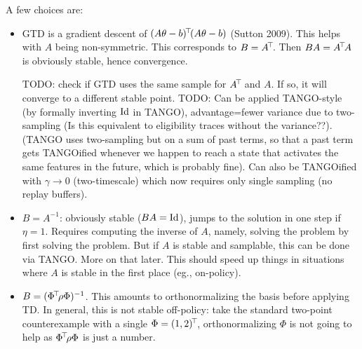 \documentclass[11pt,a4paper]{article}
\begin{document}
A few choices are:
\begin{itemize}
\item GTD is a gradient descent of
$(A\theta-b)^{\!\top}\!(A\theta-b)$ (Sutton 2009). This helps with $A$ being non-symmetric.
This corresponds to $B=A^{\!\top}\!$. Then
$BA=A^{\!\top}\!A$ is
obviously stable, hence convergence.

TODO: check if
GTD uses the same sample for $A^{\!\top}\!$ and $A$. If so, it will
converge to a different stable point. TODO: Can be applied TANGO-style
(by formally inverting $\operatorname{Id}$ in TANGO), advantage=fewer variance due to
two-sampling (Is this equivalent to eligibility traces without the
variance??). (TANGO uses two-sampling but on a sum of past terms, so
that a past term gets TANGOified whenever we happen to reach a state that
activates the same features in the future, which is probably fine). Can
also be TANGOified with $\gamma\to 0$ (two-timescale) which now requires
only single sampling (no replay buffers).

\item $B=A^{-1}$: obviously stable ($BA=\operatorname{Id}$), jumps to the solution in one step if
$\eta=1$. Requires computing the inverse of $A$, namely, solving the
problem by first solving the problem. But if $A$ is stable and samplable,
this can be done via TANGO. More on that later. This should speed up
things in situations where $A$ is stable in the first place (eg.,
on-policy).

\item $B=(\Phi^{\!\top}\!\rho\Phi)^{-1}$. This amounts to orthonormalizing
the basis before applying TD. In general, this is not stable off-policy: take the
standard two-point counterexample with a single $\Phi=(1,2)^{\!\top}\!$,
orthonormalizing $\Phi$ is not going to help as $\Phi^{\!\top}\!\rho\Phi$
is just a number.


\end{itemize}
\end{document}
